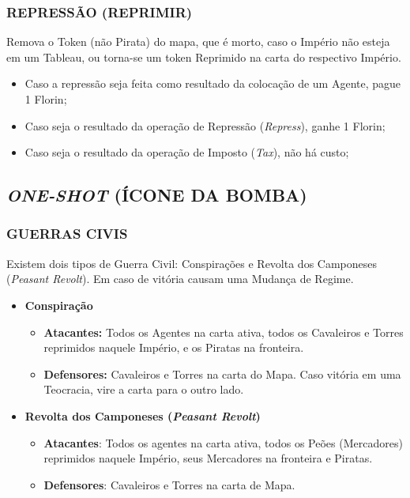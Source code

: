 \documentclass[11pt]{article}
\begin{document}
\subsubsection{REPRESSÃO (REPRIMIR)}
\label{sec:org5a57727}

Remova o Token (não Pirata) do mapa, que é morto, caso o Império não esteja em um Tableau, ou torna-se um token Reprimido na carta do respectivo Império.

\begin{itemize}
\item Caso a repressão seja feita como resultado da colocação de um Agente, pague 1 Florin;

\item Caso seja o resultado da operação de Repressão (\emph{Repress}), ganhe 1 Florin;

\item Caso seja o resultado da operação de Imposto (\emph{Tax}), não há custo;
\end{itemize}


\subsection{\emph{ONE-SHOT} (ÍCONE DA BOMBA)}
\label{sec:org875cd75}

\subsubsection{GUERRAS CIVIS}
\label{sec:org7da11ed}

Existem dois tipos de Guerra Civil: Conspirações e Revolta dos Camponeses (\emph{Peasant Revolt}). Em caso de vitória causam uma Mudança de Regime.

\begin{itemize}
\item \textbf{Conspiração}
\begin{itemize}
\item \textbf{Atacantes:} Todos os Agentes na carta ativa, todos os Cavaleiros e Torres reprimidos naquele Império, e os Piratas na fronteira.
\item \textbf{Defensores:} Cavaleiros e Torres na carta do Mapa. Caso vitória em uma Teocracia, vire a carta para o outro lado.
\end{itemize}

\item \textbf{Revolta dos Camponeses (\emph{Peasant Revolt})}
\begin{itemize}
\item \textbf{Atacantes}: Todos os agentes na carta ativa, todos os Peões (Mercadores) reprimidos naquele Império, seus Mercadores na fronteira e Piratas.
\item \textbf{Defensores}: Cavaleiros e Torres na carta de Mapa.
\end{itemize}
\end{itemize}
\end{document}
